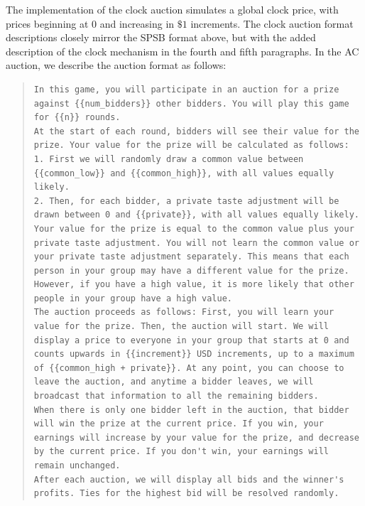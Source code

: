 \documentclass{article} %
\begin{document}
The implementation of the clock auction simulates a global clock price, with prices beginning at $0$ and increasing in $\$1$ increments. The clock auction format descriptions closely mirror the SPSB format above, but with the added description of the clock mechanism in the fourth and fifth paragraphs. 
In the AC auction, we describe the auction format as follows: \begin{quote}
\begin{lstlisting}[basicstyle=\ttfamily, breaklines=true]
In this game, you will participate in an auction for a prize against {{num_bidders}} other bidders. You will play this game for {{n}} rounds. 
At the start of each round, bidders will see their value for the prize. Your value for the prize will be calculated as follows:
1. First we will randomly draw a common value between {{common_low}} and {{common_high}}, with all values equally likely.
2. Then, for each bidder, a private taste adjustment will be drawn between 0 and {{private}}, with all values equally likely.
Your value for the prize is equal to the common value plus your private taste adjustment. You will not learn the common value or your private taste adjustment separately. This means that each person in your group may have a different value for the prize. However, if you have a high value, it is more likely that other people in your group have a high value.
The auction proceeds as follows: First, you will learn your value for the prize. Then, the auction will start. We will display a price to everyone in your group that starts at 0 and counts upwards in {{increment}} USD increments, up to a maximum of {{common_high + private}}. At any point, you can choose to leave the auction, and anytime a bidder leaves, we will broadcast that information to all the remaining bidders. 
When there is only one bidder left in the auction, that bidder will win the prize at the current price. If you win, your earnings will increase by your value for the prize, and decrease by the current price. If you don't win, your earnings will remain unchanged.
After each auction, we will display all bids and the winner's profits. Ties for the highest bid will be resolved randomly.\end{lstlisting}
\end{quote}
\end{document}
